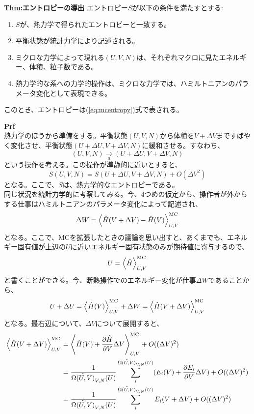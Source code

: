 \documentclass[a4paper,11pt]{jsarticle}
\numberwithin{equation}{section}
\begin{document}
\begin{itembox}[l]{\textbf{Thm:エントロピーの導出}}
  エントロピー$S$が以下の条件を満たすとする:
  \begin{enumerate}
    \item $S$が、熱力学で得られたエントロピーと一致する。
    \item 平衡状態が統計力学により記述される。
    \item ミクロな力学によって現れる$(U,V,N)$は、それぞれマクロに見たエネルギー、体積、粒子数である。
    \item 熱力学的な系への力学的操作は、ミクロな力学では、ハミルトニアンのパラメータ変化として表現できる。
  \end{enumerate}
  このとき、エントロピーは(\ref{eq:mcentropy})式で表される。
\end{itembox}
\textbf{Prf}\\
熱力学のほうから準備をする。平衡状態$(U,V,N)$から体積を$V+\Delta V$まですばやく変化させ、平衡状態$(U+\Delta U,V+\Delta V,N)$に緩和させる。すなわち、
\begin{equation}
  (U,V,N) \underset{a}{\rightarrow} (U+\Delta U,V+\Delta V,N) 
\end{equation}
という操作を考える。この操作が準静的に近いとすると、
\begin{equation}
  S(U,V,N) = S(U+\Delta U,V+\Delta V,N) + O(\Delta V ^2)
\end{equation}
となる。ここで、$S$は、熱力学的なエントロピーである。\\
同じ状況を統計力学的に考察してみる。今、4つめの仮定から、操作者が外からする仕事はハミルトニアンのパラメータ変化によって記述され、
\begin{equation}
  \Delta W = \expval{\hat{H}(V+\Delta V)-\hat{H}(V)}_{U,V}^{\text{MC}}
\end{equation}
となる。ここで、MCを拡張したときの議論を思い出すと、あくまでも、エネルギー固有値が上辺の$U$に近いエネルギー固有状態のみが期待値に寄与するので、
\begin{equation}
  U = \expval{\hat{H}}_{U,V}^{\text{MC}}
\end{equation}
と書くことができる。今、断熱操作でのエネルギー変化が仕事$\Delta W$であることから、
\begin{equation}
  U + \Delta U = \expval{\hat{H}(V)}_{U,V}^{\text{MC}} + \Delta W = \expval{\hat{H}(V+\Delta V)}_{U,V}^{\text{MC}}
\end{equation}
となる。最右辺について、$\Delta V$について展開すると、
\begin{align}
  \expval{\hat{H}(V+\Delta V)}_{U,V}^{\text{MC}} &= \expval{\hat{H}(V) + \pdv{\hat{H}}{V}\Delta V}_{U,V}^{\text{MC}} + O((\Delta V)^2)\\
  &= \frac{1}{\tilde{\Omega(U,V)}_{V,N}(U)}\sum_{i}^{\tilde{\Omega(U,V)}_{V,N}(U)} (E_i(V) + \pdv{E_i}{V}\Delta V) + O((\Delta V)^2)\\
  &= \frac{1}{\tilde{\Omega(U,V)}_{V,N}(U)}\sum_{i}^{\tilde{\Omega(U,V)}_{V,N}(U)} E_i(V+\Delta V) + O((\Delta V)^2)
\end{align}
\end{document}
